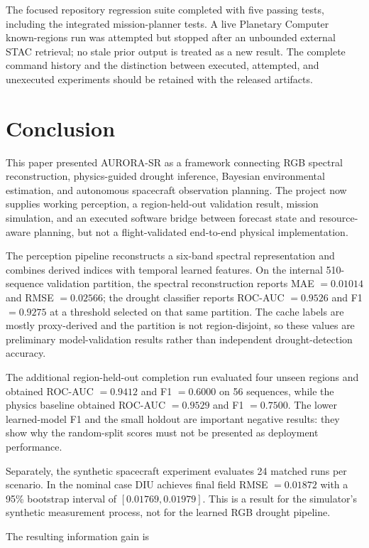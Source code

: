 \documentclass[11pt,a4paper]{article}
\begin{document}
The focused repository regression suite completed with five passing
tests, including the integrated mission-planner tests.  A live
Planetary Computer known-regions run was attempted but stopped after an
unbounded external STAC retrieval; no stale prior output is treated as a
new result.  The complete command history and the distinction between
executed, attempted, and unexecuted experiments should be retained with
the released artifacts.

\section{Conclusion}

This paper presented AURORA-SR as a framework connecting RGB spectral
reconstruction, physics-guided drought inference, Bayesian
environmental estimation, and autonomous spacecraft observation
planning. The project now supplies working perception, a region-held-out
validation result, mission simulation, and an executed software bridge
between forecast state and resource-aware planning, but not a
flight-validated end-to-end physical implementation.

The perception pipeline reconstructs a six-band spectral
representation and combines derived indices with temporal learned
features. On the internal 510-sequence validation partition, the
spectral reconstruction reports MAE $=0.01014$ and RMSE $=0.02566$;
the drought classifier reports ROC-AUC $=0.9526$ and F1 $=0.9275$ at
a threshold selected on that same partition. The cache labels are
mostly proxy-derived and the partition is not region-disjoint, so
these values are preliminary model-validation results rather than
independent drought-detection accuracy.

The additional region-held-out completion run evaluated four unseen
regions and obtained ROC-AUC $=0.9412$ and F1 $=0.6000$ on 56 sequences,
while the physics baseline obtained ROC-AUC $=0.9529$ and F1 $=0.7500$.
The lower learned-model F1 and the small holdout are important negative
results: they show why the random-split scores must not be presented as
deployment performance.

Separately, the synthetic spacecraft experiment evaluates 24 matched
runs per scenario. In the nominal case DIU achieves final field RMSE
$=0.01872$ with a 95\% bootstrap interval of
$[0.01769,0.01979]$. This is a result for the simulator's synthetic
measurement process, not for the learned RGB drought pipeline.

The resulting information gain is
\end{document}
